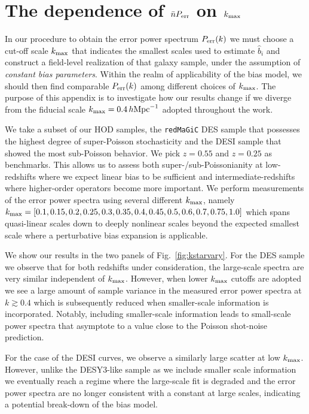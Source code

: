 \documentclass[fleqn,usenatbib]{mnras}
\newcommand{\redmagic}{\texttt{redMaGiC} }
\newcommand{\ihmpc}{\,h{\rm Mpc}^{-1}}
\newcommand{\kmax}{k_{\rm max}}
\begin{document}
\section{The dependence of $\bar{n}P_{\rm err}$ on $k_{\rm max}$}
\label{appendix:B}
In our procedure to obtain the error power spectrum $P_{\rm err}(k)$ we must choose a cut-off scale $k_{\rm max}$ that indicates the smallest scales used to estimate $\hat{b}_i$ and construct a field-level realization of that galaxy sample, under the assumption of \emph{constant bias parameters}. Within the realm of applicability of the bias model, we should then find comparable $P_{\rm err}(k)$ among different choices of $k_{\rm max}$. The purpose of this appendix is to investigate how our results change if we diverge from the fiducial scale $k_{\rm max} = 0.4 \ihmpc$ adopted throughout the work. \par 
We take a subset of our HOD samples, the \redmagic DES sample that possesses the highest degree of super-Poisson stochasticity and the DESI sample that showed the most sub-Poisson behavior. We pick $z=0.55$ and $z=0.25$ as benchmarks. This allows us to assess both super-/sub-Poissonianity at low-redshifts where we expect linear bias to be sufficient and intermediate-redshifts where higher-order operators become more important. We perform measurements of the error power spectra using several different $k_{\rm max}$, namely $k_{\rm max} = [0.1, 0.15, 0.2, 0.25, 0.3, 0.35, 0.4, 0.45, 0.5, 0.6, 0.7, 0.75, 1.0]$ which spans quasi-linear scales down to deeply nonlinear scales beyond the expected smallest scale where a perturbative bias expansion is applicable. \par 
We show our results in the two panels of Fig.~\ref{fig:kstarvary}. For the DES sample we observe that for both redshifts under consideration, the large-scale spectra are very similar independent of $\kmax$. However, when lower $\kmax$ cutoffs are adopted we see a large amount of sample variance in the measured error power spectra at $k \gtrsim 0.4$ which is subsequently reduced when smaller-scale information is incorporated. Notably, including smaller-scale information leads to small-scale power spectra that asymptote to a value close to the Poisson shot-noise prediction. \par 
For the case of the DESI curves, we observe a similarly large scatter at low $\kmax$. However, unlike the DESY3-like sample as we include smaller scale information we eventually reach a regime where the large-scale fit is degraded and the error power spectra are no longer consistent with a constant at large scales, indicating a potential break-down of the bias model. \par 
\end{document}
